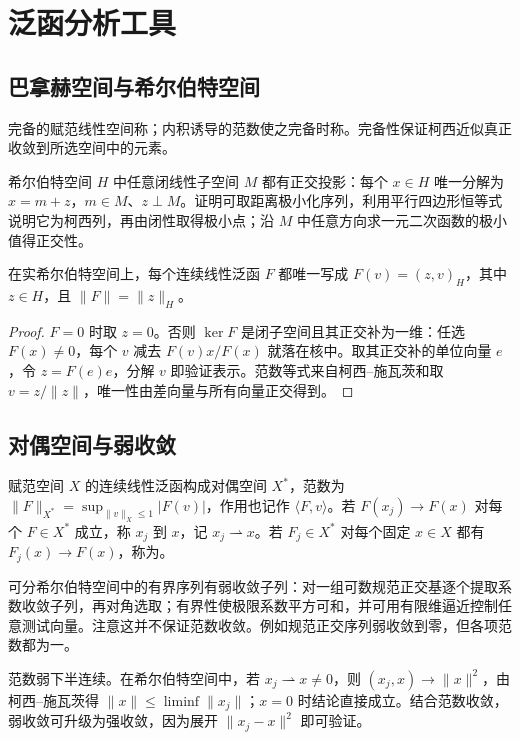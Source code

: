 \documentclass[UTF8,12pt,a4paper,fontset=fandol]{ctexbook}
\begin{document}
\chapter{泛函分析工具}
\label{app:functional}

\section{巴拿赫空间与希尔伯特空间}
完备的赋范线性空间称；内积诱导的范数使之完备时称。完备性保证柯西近似真正收敛到所选空间中的元素。

希尔伯特空间 $H$ 中任意闭线性子空间 $M$ 都有正交投影：每个 $x\in H$ 唯一分解为 $x=m+z$，$m\in M$、$z\perp M$。证明可取距离极小化序列，利用平行四边形恒等式说明它为柯西列，再由闭性取得极小点；沿 $M$ 中任意方向求一元二次函数的极小值得正交性。

\begin{theorem}
在实希尔伯特空间上，每个连续线性泛函 $F$ 都唯一写成 $F(v)=(z,v)_H$，其中 $z\in H$，且 $\|F\|=\|z\|_H$。
\end{theorem}
\begin{proof}
$F=0$ 时取 $z=0$。否则 $\ker F$ 是闭子空间且其正交补为一维：任选 $F(x)\ne0$，每个 $v$ 减去 $F(v)x/F(x)$ 就落在核中。取其正交补的单位向量 $e$，令 $z=F(e)e$，分解 $v$ 即验证表示。范数等式来自柯西--施瓦茨和取 $v=z/\|z\|$，唯一性由差向量与所有向量正交得到。
\end{proof}

\section{对偶空间与弱收敛}
赋范空间 $X$ 的连续线性泛函构成对偶空间 $X^*$，范数为 $\|F\|_{X^*}=\sup_{\|v\|_X\le1}|F(v)|$，作用也记作 $\langle F,v\rangle$。若 $F(x_j)\to F(x)$ 对每个 $F\in X^*$ 成立，称 $x_j$ 到 $x$，记 $x_j\rightharpoonup x$。若 $F_j\in X^*$ 对每个固定 $x\in X$ 都有 $F_j(x)\to F(x)$，称为。

可分希尔伯特空间中的有界序列有弱收敛子列：对一组可数规范正交基逐个提取系数收敛子列，再对角选取；有界性使极限系数平方可和，并可用有限维逼近控制任意测试向量。注意这并不保证范数收敛。例如规范正交序列弱收敛到零，但各项范数都为一。

范数弱下半连续。在希尔伯特空间中，若 $x_j\rightharpoonup x\ne0$，则 $(x_j,x)\to\|x\|^2$，由柯西--施瓦茨得 $\|x\|\le\liminf\|x_j\|$；$x=0$ 时结论直接成立。结合范数收敛，弱收敛可升级为强收敛，因为展开 $\|x_j-x\|^2$ 即可验证。
\end{document}
